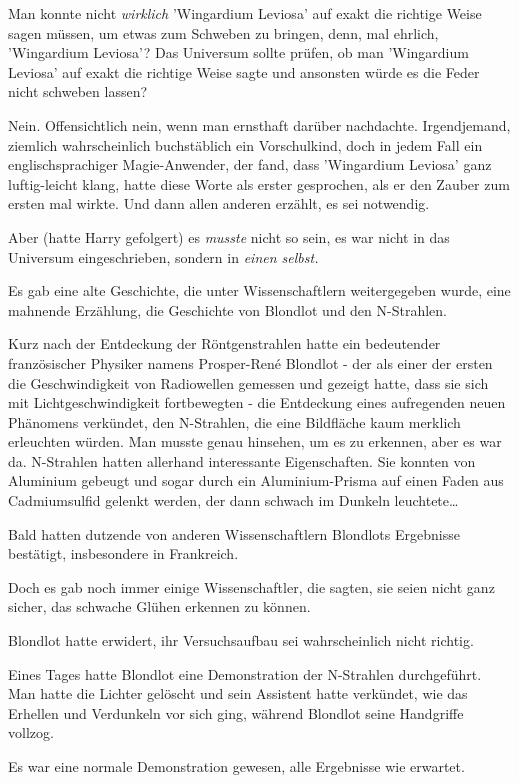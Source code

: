 {Man konnte nicht \emph{wirklich} 'Wingardium Leviosa' auf exakt die richtige Weise sagen müssen, um etwas zum Schweben zu bringen, denn, mal ehrlich, 'Wingardium Leviosa'? Das Universum sollte prüfen, ob man 'Wingardium Leviosa' auf exakt die richtige Weise sagte und ansonsten würde es die Feder nicht schweben lassen?

Nein. Offensichtlich nein, wenn man ernsthaft darüber nachdachte. Irgendjemand, ziemlich wahrscheinlich buchstäblich ein Vorschulkind, doch in jedem Fall ein englischsprachiger Magie-Anwender, der fand, dass 'Wingardium Leviosa' ganz luftig-leicht klang, hatte diese Worte als erster gesprochen, als er den Zauber zum ersten mal wirkte. Und dann allen anderen erzählt, es sei notwendig.

Aber (hatte Harry gefolgert) es \emph{musste} nicht so sein, es war nicht in das Universum eingeschrieben, sondern in \emph{einen selbst.}

Es gab eine alte Geschichte, die unter Wissenschaftlern weitergegeben wurde, eine mahnende Erzählung, die Geschichte von Blondlot und den N-Strahlen.

Kurz nach der Entdeckung der Röntgenstrahlen hatte ein bedeutender französischer Physiker namens Prosper-René Blondlot - der als einer der ersten die Geschwindigkeit von Radiowellen gemessen und gezeigt hatte, dass sie sich mit Lichtgeschwindigkeit fortbewegten - die Entdeckung eines aufregenden neuen Phänomens verkündet, den N-Strahlen, die eine Bildfläche kaum merklich erleuchten würden. Man musste genau hinsehen, um es zu erkennen, aber es war da. N-Strahlen hatten allerhand interessante Eigenschaften. Sie konnten von Aluminium gebeugt und sogar durch ein Aluminium-Prisma auf einen Faden aus Cadmiumsulfid gelenkt werden, der dann schwach im Dunkeln leuchtete…

Bald hatten dutzende von anderen Wissenschaftlern Blondlots Ergebnisse bestätigt, insbesondere in Frankreich.

Doch es gab noch immer einige Wissenschaftler, die sagten, sie seien nicht ganz sicher, das schwache Glühen erkennen zu können.

Blondlot hatte erwidert, ihr Versuchsaufbau sei wahrscheinlich nicht richtig.

Eines Tages hatte Blondlot eine Demonstration der N-Strahlen durchgeführt. Man hatte die Lichter gelöscht und sein Assistent hatte verkündet, wie das Erhellen und Verdunkeln vor sich ging, während Blondlot seine Handgriffe vollzog.

Es war eine normale Demonstration gewesen, alle Ergebnisse wie erwartet.

}
